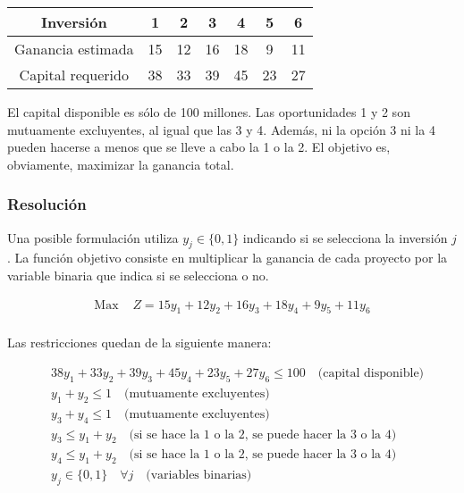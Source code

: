 \documentclass[12pt]{article}
\begin{document}
\begin{table}[H]
    \centering
    \begin{tabular}{c|cccccc}
        \toprule
        Inversión & 1 & 2 & 3 & 4 & 5 & 6 \\
        \midrule
        Ganancia estimada & 15 & 12 & 16 & 18 & 9 & 11 \\
        Capital requerido & 38 & 33 & 39 & 45 & 23 & 27 \\
        \bottomrule
    \end{tabular}
\end{table}

\vspace{0.5em}
El capital disponible es sólo de 100 millones. Las oportunidades 1 y 2 son mutuamente excluyentes, al igual que las 3 y 4. Además, ni la opción 3 ni la 4 pueden hacerse a menos que se lleve a cabo la 1 o la 2. El objetivo es, obviamente, maximizar la ganancia total.

\subsubsection{Resolución}

Una posible formulación utiliza $y_j \in \{0,1\}$ indicando si se selecciona la inversión $j$. La función objetivo consiste en multiplicar la ganancia de cada proyecto por la variable binaria que indica si se selecciona o no.

\begin{align*}
    \text{Max } & Z = 15y_1 + 12y_2 + 16y_3 + 18y_4 + 9y_5 + 11y_6 \\
\end{align*}

Las restricciones quedan de la siguiente manera:

\begin{align*}
    & 38y_1 + 33y_2 + 39y_3 + 45y_4 + 23y_5 + 27y_6 \le 100 \quad \text{(capital disponible)} \\
    & y_1 + y_2 \le 1 \quad \text{(mutuamente excluyentes)} \\
    & y_3 + y_4 \le 1 \quad \text{(mutuamente excluyentes)} \\
    & y_3 \le y_1 + y_2 \quad \text{(si se hace la 1 o la 2, se puede hacer la 3 o la 4)} \\
    & y_4 \le y_1 + y_2 \quad \text{(si se hace la 1 o la 2, se puede hacer la 3 o la 4)} \\
    & y_j \in \{0,1\} \quad \forall j \quad \text{(variables binarias)} \\
\end{align*}
\end{document}
